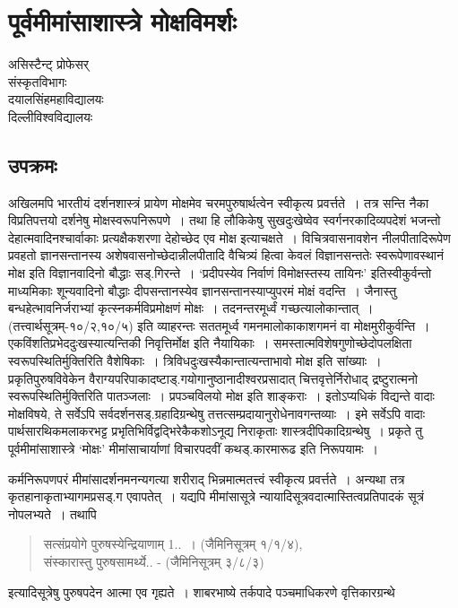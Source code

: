 {\fontsize{15}{17}\selectfont
\chapter{पूर्वमीमांसाशास्त्रे मोक्षविमर्शः}

\begin{center}
\smallskip

असिस्टैन्ट् प्रोफेसर्\\
संस्कृतविभागः\\
दयालसिंहमहाविद्यालयः\\
दिल्लीविश्वविद्यालयः
\addrule
\end{center}
 
\section*{उपक्रमः}

अखिलमपि भारतीयं दर्शनशास्त्रं प्रायेण मोक्षमेव चरमपुरुषार्थत्वेन स्वीकृत्य प्रवर्त्तते~। तत्र सन्ति नैका विप्रतिपत्तयो दर्शनेषु मोक्षस्वरूपनिरूपणे~। तथा हि लौकिकेषु सुखदुःखेष्वेव स्वर्गनरकादिव्यपदेशं भजन्तो देहात्मवादिनश्चार्वाकाः प्रत्यक्षैकशरणा देहोच्छेद एव मोक्ष इत्याचक्षते~। विचित्रवासनावशेन नीलपीतादिरूपेण प्रवहतो ज्ञानसन्तानस्य अशेषवासनोच्छेदान्नीलपीतादि वैचित्र्यं हित्वा केवलं विज्ञानसन्ततेः स्वरूपेणावस्थानं मोक्ष इति विज्ञानवादिनो बौद्धाः सड्.गिरन्ते~। ‘प्रदीपस्येव निर्वाणं विमोक्षस्तस्य तायिनः’ इतिस्वीकुर्वन्तो माध्यमिकाः शून्यवादिनो बौद्धाः दीपसन्तानस्येव ज्ञानसन्तानस्याप्युपरमं मोक्षं वदन्ति~। जैनास्तु  बन्धहेत्भावनिर्जराभ्यां कृत्स्नकर्मविप्रमोक्षणं मोक्षः~। तदनन्तरमूर्ध्वं गच्छत्यालोकान्तात्~। (तत्त्वार्थसूत्रम्-१०/२,१०/५) इति व्याहरन्तः सततमूर्ध्व गमनमालोकाकाशगमनं वा मोक्षमुरीकुर्वन्ति~। एकविंशतिप्रभेददुःखस्यात्यन्तिकी निवृत्तिर्मोक्ष इति नैयायिकाः~। समस्तात्मविशेषगुणोच्छेदोपलक्षिता स्वरूपस्थितिर्मुक्तिरिति वैशेषिकाः~। त्रिविधदुःखस्यैकान्तात्यन्ताभावो मोक्ष इति सांख्याः~। प्रकृतिपुरुषविवेकेन वैराग्यपरिपाकादष्टाड्.गयोगानुष्ठानादीश्वरप्रसादात् चित्तवृत्तेर्निरोधाद् द्रष्टुरात्मनो स्वरूपस्थितिर्मुक्तिरिति पातञ्जलाः~। प्रपञ्चविलयो मोक्ष इति शाङ्कराः~। इतोऽप्यधिकं विद्यन्ते वादाः मोक्षविषये, ते सर्वेऽपि सर्वदर्शनसड्.ग्रहादिग्रन्थेषु तत्तत्सम्प्रदायानुरोधेनावगन्तव्याः~। इमे सर्वेऽपि वादाः पार्थसारथिकमलाकरभट्ट प्रभृतिभिर्विद्वद्भिरेकैकशोऽनूद्य निराकृताः शास्त्रदीपिकादिग्रन्थेषु~। प्रकृते तु पूर्वमीमांसाशास्त्रे ‘मोक्षः’ मीमांसाचार्याणां विचारपदवीं कथड्.कारमारूढ इति निरूपयामः~। 

कर्मनिरूपणपरं मीमांसादर्शनमनन्यगत्या शरीराद् भिन्नमात्मतत्त्वं स्वीकृत्य प्रवर्त्तते~। अन्यथा तत्र कृतहानाकृताभ्यागमप्रसड्.ग एवापतेत्~। यद्यपि मीमांसासूत्रे न्यायादिसूत्रवदात्मास्तित्वप्रतिपादकं सूत्रं नोपलभ्यते~। तथापि 
\begin{verse}
सत्संप्रयोगे पुरुषस्येन्द्रियाणाम् 1..~। (जैमिनिसूत्रम् १/­१/४), \\
संस्कारास्तु पुरुषसामर्थ्ये.. - (जैमिनिसूत्रम् ३/­८/३) 
\end{verse}
इत्यादिसूत्रेषु पुरुषपदेन आत्मा एव गृह्यते~। शाबरभाष्ये तर्कपादे पञ्चमाधिकरणे वृत्तिकारग्रन्थे 

}
